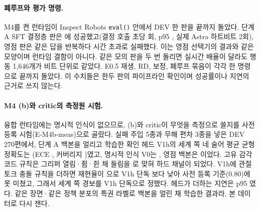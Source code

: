 \paragraph{폐루프와 평가 명령.}
M4를 켠 런타임이 Inspect Robots \texttt{eval()} 안에서 DEV 한 판을 끝까지 돌았다. 단계 A SFT 결정층 판은 에 성공했고(결정 호출 초당 회, p95 , 실제 Astra 하트비트 2회), 영점 판은 같은 답을 반복하다 시간 초과로 실패했다. 이는 영점 선택기의 결과와 같은 모양이며 런타임 결함이 아니다. 같은 모의 판을 두 번 돌리면 실시간 배율이 달라도 행동 1,646개가 비트 단위로 같았다. E0.5 재생, RD, 보정, 폐루프 묶음이 각각 한 명령으로 끝까지 돌았다. 이 수치들은 한두 판의 파이프라인 확인이며 성공률이나 지연의 근거로 쓰지 않는다.

\paragraph{M4 (b)와 critic의 측정원 시험.}
융합 런타임에는 명시적 인식이 없으므로, (b)와 critic이 무엇을 측정으로 쓸지를 사전 등록 시험(E-M4b-meas)으로 골랐다. 실패 주입 5종과 무해 편차 3종을 넣은 DEV 270편에서, 단계 A 백본을 얼리고 학습한 확인 헤드 V1h의 세계 쪽 네 술어 평균 균형 정확도는 (ECE , 커버리지 )였고, 명시적 인식 V0는 , 영점 백본은 이었다. 고유 감각 코드 규칙은 그리퍼 열림·쥠·쥔 채 들림을 로 맞혀 하드 채널이 되었다. V1h에 관절 토크 충돌 규칙을 더하면 재현율이 으로 V1h 단독 보다 낮아 사전 등록 기준(0.80)에 못 미쳤고, 그래서 세계 쪽 경보를 V1h 단독으로 정했다. 헤드가 더하는 지연은 p95 였다. 같은 장면·같은 정책 분포의 특권 라벨로 백본을 얼린 채 학습한 결과라, 본 데이터로 다시 잰다.

